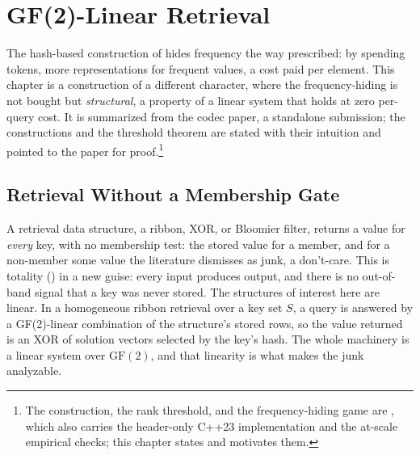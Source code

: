 
\chapter{GF(2)-Linear Retrieval}
\label{ch:gf2-retrieval}

The hash-based construction of  hides frequency
the way  prescribed: by spending tokens, more
representations for frequent values, a cost paid per element. This chapter is
a construction of a different character, where the frequency-hiding is not
bought but \emph{structural}, a property of a linear system that holds at
zero per-query cost. It is summarized from the codec paper, a standalone
submission; the constructions and the threshold theorem are stated with their
intuition and pointed to the paper for proof.\footnote{The construction, the
rank threshold, and the frequency-hiding game are \cite{towell2026codec},
which also carries the header-only C++23 implementation and the at-scale
empirical checks; this chapter states and motivates them.}

\section{Retrieval Without a Membership Gate}
\label{sec:retrieval-no-gate}

A retrieval data structure, a ribbon, XOR, or Bloomier filter, returns a
value for \emph{every} key, with no membership test: the stored value for a
member, and for a non-member some value the literature dismisses as junk, a
don't-care. This is totality () in a new guise: every
input produces output, and there is no out-of-band signal that a key was
never stored. The structures of interest here are linear. In a homogeneous
ribbon retrieval over a key set $S$, a query is answered by a GF(2)-linear
combination of the structure's stored rows, so the value returned is an XOR
of solution vectors selected by the key's hash. The whole machinery is a
linear system over $\mathrm{GF}(2)$, and that linearity is what makes the junk
analyzable.

